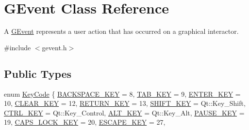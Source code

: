 \hypertarget{classsgl_1_1GEvent}{}\section{G\+Event Class Reference}
\label{classsgl_1_1GEvent}


A \mbox{\hyperlink{classsgl_1_1GEvent}{G\+Event}} represents a user action that has occurred on a graphical interactor.  




{\ttfamily \#include $<$gevent.\+h$>$}

\subsection*{Public Types}
\begin{DoxyCompactItemize}
\item 
enum \mbox{\hyperlink{classsgl_1_1GEvent_a7885f47644a0388f981f416fa20389b2}{Key\+Code}} \{ \newline
\mbox{\hyperlink{classsgl_1_1GEvent_a7885f47644a0388f981f416fa20389b2a4dd1e53528965cb26b7ef9dc9cca8485}{B\+A\+C\+K\+S\+P\+A\+C\+E\+\_\+\+K\+EY}} = 8, 
\mbox{\hyperlink{classsgl_1_1GEvent_a7885f47644a0388f981f416fa20389b2ad538ab9675c9668313689f95378a4b55}{T\+A\+B\+\_\+\+K\+EY}} = 9, 
\mbox{\hyperlink{classsgl_1_1GEvent_a7885f47644a0388f981f416fa20389b2a3e386e3874767e9b60555335164772ff}{E\+N\+T\+E\+R\+\_\+\+K\+EY}} = 10, 
\mbox{\hyperlink{classsgl_1_1GEvent_a7885f47644a0388f981f416fa20389b2a02e6a96abb0a5969b840025a87a67637}{C\+L\+E\+A\+R\+\_\+\+K\+EY}} = 12, 
\mbox{\hyperlink{classsgl_1_1GEvent_a7885f47644a0388f981f416fa20389b2af5ac08fefce6ee222239468bdfd9e828}{R\+E\+T\+U\+R\+N\+\_\+\+K\+EY}} = 13, 
\mbox{\hyperlink{classsgl_1_1GEvent_a7885f47644a0388f981f416fa20389b2a2bbaf2a7978d88e9522825aa6f145265}{S\+H\+I\+F\+T\+\_\+\+K\+EY}} = Qt\+:\+:Key\+\_\+\+Shift, 
\mbox{\hyperlink{classsgl_1_1GEvent_a7885f47644a0388f981f416fa20389b2a050f925d6eb111283fda69cfbf604c33}{C\+T\+R\+L\+\_\+\+K\+EY}} = Qt\+:\+:Key\+\_\+\+Control, 
\mbox{\hyperlink{classsgl_1_1GEvent_a7885f47644a0388f981f416fa20389b2a01fa85cb918fb185760ebd24531be258}{A\+L\+T\+\_\+\+K\+EY}} = Qt\+:\+:Key\+\_\+\+Alt, 
\mbox{\hyperlink{classsgl_1_1GEvent_a7885f47644a0388f981f416fa20389b2a6a27d19c37941821112decd8a2c301d6}{P\+A\+U\+S\+E\+\_\+\+K\+EY}} = 19, 
\mbox{\hyperlink{classsgl_1_1GEvent_a7885f47644a0388f981f416fa20389b2a9ea9cefc98302c5ea58a366bbe13ab91}{C\+A\+P\+S\+\_\+\+L\+O\+C\+K\+\_\+\+K\+EY}} = 20, 
\mbox{\hyperlink{classsgl_1_1GEvent_a7885f47644a0388f981f416fa20389b2ad710e81a592eb9cdec0c237c1efdc027}{E\+S\+C\+A\+P\+E\+\_\+\+K\+EY}} = 27, 

\end{DoxyCompactItemize}

